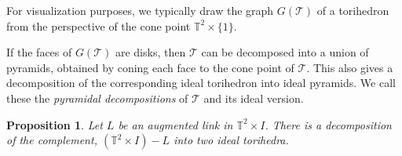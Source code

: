 \documentclass[11pt]{amsart}
\newcommand{\torus}{{\mathbb{T}^2}}
\newcommand{\sT}{{\mathcal{T}}}
\theoremstyle{plain}
\newtheorem{prop}[theorem]{Proposition}
\theoremstyle{definition}
\begin{document}
For visualization purposes, we typically draw the graph $G(\sT)$ of a
torihedron from the perspective of the cone point $\torus \times \{1\}$.

If the faces of $G(\sT)$ are disks,
then $\sT$ can be decomposed into a union of pyramids,
obtained by coning each face to the cone point of $\sT$.
This also gives a decomposition of the corresponding ideal torihedron
into ideal pyramids.
We call these the \emph{pyramidal decompositions} of $\sT$ and its
ideal version.


\begin{prop}\label{p:tori_decomp}
Let $L$ be an augmented link in $\torus \times I$.
There is a decomposition of the complement,
$(\torus \times I) - L$ into two ideal torihedra.
\end{prop}
\end{document}
